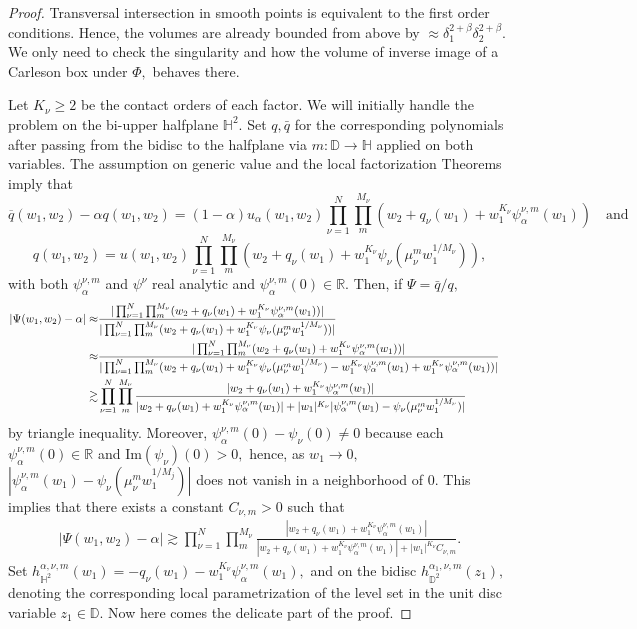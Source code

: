 \documentclass[12pt]{amsart}
\numberwithin{equation}{section}
\begin{document}
\begin{proof}
Transversal intersection in smooth points is equivalent to the first order conditions. Hence, the volumes are already bounded from above by $\approx\delta_1^{2+\beta}\delta_2^{2+\beta}.$
We only need to check the singularity and how the volume of inverse image of a Carleson box under $\Phi,$ behaves there.

Let $K_\nu\ge 2$ be the contact orders of each factor. We will initially handle the problem on the bi-upper halfplane $\mathbb{H}^2.$ Set $q,\bar{q}$ for the corresponding polynomials after passing from the bidisc to the halfplane via $m:\mathbb{D}\to\mathbb{H}$ applied on both variables. The assumption on generic value and the local factorization Theorems imply that
$$\overline{q}(w_1,w_2)-\alpha q(w_1,w_2)=(1-\alpha)u_{\alpha}(w_1,w_2)\prod_{\nu=1}^N\prod_{m}^{M_\nu}(w_2+q_\nu(w_1)+w_1^{K_\nu}\psi^{\nu,m}_{\alpha}(w_1))\quad \mathrm{and}$$
$$q(w_1,w_2)=u(w_1,w_2)\prod_{\nu=1}^N\prod_{m}^{M_\nu}(w_2+q_\nu(w_1)+w_1^{K_\nu}\psi_\nu(\mu_\nu^mw_1^{1/M_{\nu}})),$$
with both $\psi^{\nu,m}_{\alpha}$ and $\psi^\nu$ real analytic and $\psi_{\alpha}^{\nu,m}(0)\in\mathbb{R}.$ Then, if $\Psi=\bar{q}/q,$
\begin{align}  |\Psi(w_1,w_2)-\alpha|\approx& \frac{|\prod_{\nu=1}^N\prod_{m}^{M_\nu}(w_2+q_\nu(w_1)+w_1^{K_\nu}\psi^{\nu,m}_{\alpha}(w_1))|}{|\prod_{\nu=1}^N\prod_{m}^{M_\nu}(w_2+q_\nu(w_1)+w_1^{K_\nu}\psi_\nu(\mu_\nu^mw_1^{1/M_{\nu}}))|}\notag&&\\
\approx& \frac{|\prod_{\nu=1}^N\prod_{m}^{M_\nu}(w_2+q_\nu(w_1)+w_1^{K_\nu}\psi^{\nu,m}_{\alpha}(w_1))|}{|\prod_{\nu=1}^N\prod_{m}^{M_\nu}(w_2+q_\nu(w_1)+w_1^{K_\nu}\psi_\nu(\mu_\nu^mw_1^{1/M_{\nu}})-w_1^{K_\nu}\psi^{\nu,m}_{\alpha}(w_1)+w_1^{K_\nu}\psi^{\nu,m}_{\alpha}(w_1))|}\notag&&\\
\gtrsim& \prod_{\nu=1}^N\prod_{m}^{M_\nu}\frac{|w_2+q_\nu(w_1)+w_1^{K_{\nu}}\psi^{\nu,m}_{\alpha}(w_1)|}{|w_2+q_\nu(w_1)+w_1^{K_\nu}\psi_{\alpha}^{\nu,m}(w_1)|+|w_1|^{K_\nu}|\psi^{\nu,m}_{\alpha}(w_1)-\psi_\nu(\mu_{\nu}^mw_1^{1/M_\nu})|}
\end{align}
by triangle inequality. Moreover, $\psi_{\alpha}^{\nu,m}(0)-\psi_{\nu}(0)\neq0$ because each $\psi_{\alpha}^{\nu,m}(0)\in\mathbb{R}$ and $\mathrm{Im}(\psi_\nu)(0)>0,$ hence, as $w_1\to 0,$ $|\psi^{\nu,m}_{\alpha}(w_1)-\psi_\nu(\mu_{\nu}^mw_1^{1/M_j})|$ does not vanish in a neighborhood of $0.$ This implies that there exists a constant $C_{\nu,m}>0$ such that
\begin{align}|\Psi(w_1,w_2)-\alpha|\gtrsim\prod_{\nu=1}^N\prod_{m}^{M_\nu}\frac{|w_2+q_\nu(w_1)+w_1^{K_{\nu}}\psi^{\nu,m}_{\alpha}(w_1)|}{|w_2+q_\nu(w_1)+w_1^{K_\nu}\psi_{\alpha}^{\nu,m}(w_1)|+|w_1|^{K_\nu}C_{\nu,m}}.\label{disgustingestimate}\end{align}
Set $h^{\alpha,\nu,m}_{\mathbb{H}^2}(w_1)=-q_\nu(w_1)-w_1^{K_{\nu}}\psi_{\alpha}^{\nu,m}(w_1),$ and on the bidisc $h^{\alpha_1,\nu,m}_{\mathbb{D}^2}(z_1),$ denoting the corresponding local parametrization of the level set in the unit disc variable $z_1\in\mathbb{D}$.  Now here comes the delicate part of the proof. 


\end{proof}
\end{document}
